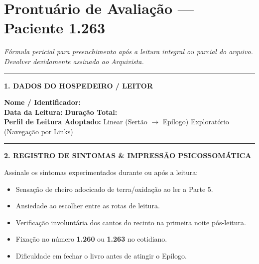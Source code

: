 \cleardoublepage
\thispagestyle{empty}
\chapter*{Prontuário de Avaliação --- Paciente 1.263}

\begingroup

\noindent\textit{Fórmula pericial para preenchimento após a leitura integral ou parcial do arquivo. Devolver devidamente assinado ao Arquivista.}

\vspace{0.8em}
\noindent\rule{\textwidth}{0.8pt}
\vspace{0.5em}

\noindent\textbf{1. DADOS DO HOSPEDEIRO / LEITOR}

\vspace{0.4em}
\noindent\textbf{Nome / Identificador:} \dotfill\\[0.4em]
\noindent\textbf{Data da Leitura:} \dotfill \quad \textbf{Duração Total:} \dotfill\\[0.4em]
\noindent\textbf{Perfil de Leitura Adoptado:} \quad [ ~ ] Linear (Sertão $\to$ Epílogo) \quad [ ~ ] Exploratório (Navegação por Links)

\vspace{1em}
\noindent\rule{\textwidth}{0.5pt}
\vspace{0.5em}

\noindent\textbf{2. REGISTRO DE SINTOMAS \& IMPRESSÃO PSICOSSOMÁTICA}

\vspace{0.4em}
\noindent Assinale os sintomas experimentados durante ou após a leitura:

\vspace{0.3em}
\begin{itemize}[leftmargin=1.5em,itemsep=0.2em]
  \item[$\square$] Sensação de cheiro adocicado de terra/oxidação ao ler a Parte 5.
  \item[$\square$] Ansiedade ao escolher entre as rotas de leitura.
  \item[$\square$] Verificação involuntária dos cantos do recinto na primeira noite pós-leitura.
  \item[$\square$] Fixação no número \textbf{1.260} ou \textbf{1.263} no cotidiano.
  \item[$\square$] Dificuldade em fechar o livro antes de atingir o Epílogo.
\end{itemize}

